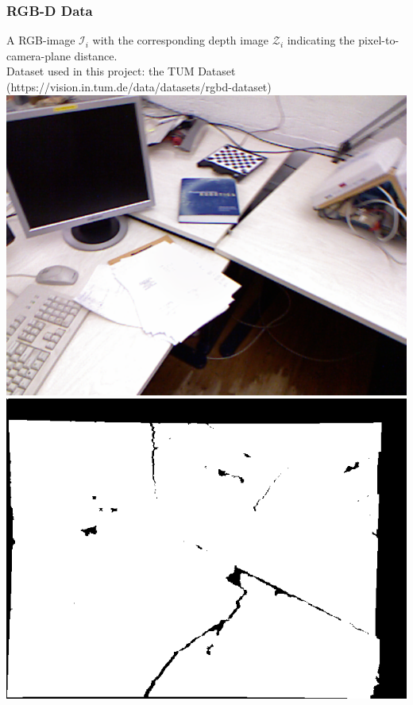 \begin{frame}
\frametitle{RGB-D Data}

A RGB-image $\mathcal{I}_i$ with the corresponding depth image $\mathcal{Z}_i$ indicating the pixel-to-camera-plane distance. \\

Dataset used in this project: the TUM Dataset (https://vision.in.tum.de/data/datasets/rgbd-dataset) \\[\baselineskip]

\includegraphics[height=.5\paperheight]{Bilder/rgbd-rgb.png}
\hspace{6.5mm}%
\includegraphics[height=.5\paperheight]{Bilder/rgbd-depth.png}

\end{frame}
\clearpage

